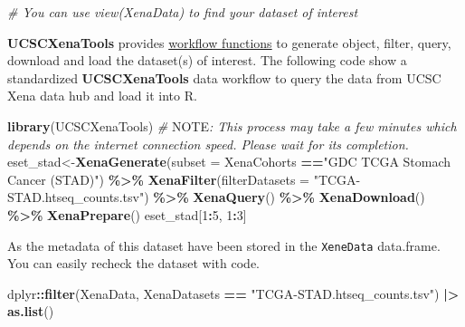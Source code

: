 \documentclass[
  12pt,
]{book}
\newenvironment{Shaded}{\begin{snugshade}}{\end{snugshade}}
\newcommand{\AlertTok}[1]{\textcolor[rgb]{0.94,0.16,0.16}{#1}}
\newcommand{\AttributeTok}[1]{\textcolor[rgb]{0.13,0.29,0.53}{#1}}
\newcommand{\CommentTok}[1]{\textcolor[rgb]{0.56,0.35,0.01}{\textit{#1}}}
\newcommand{\DecValTok}[1]{\textcolor[rgb]{0.00,0.00,0.81}{#1}}
\newcommand{\FunctionTok}[1]{\textcolor[rgb]{0.13,0.29,0.53}{\textbf{#1}}}
\newcommand{\NormalTok}[1]{#1}
\newcommand{\OtherTok}[1]{\textcolor[rgb]{0.56,0.35,0.01}{#1}}
\newcommand{\SpecialCharTok}[1]{\textcolor[rgb]{0.81,0.36,0.00}{\textbf{#1}}}
\newcommand{\StringTok}[1]{\textcolor[rgb]{0.31,0.60,0.02}{#1}}
\begin{document}
\begin{Shaded}
\begin{Highlighting}[]
\CommentTok{\# You can use view(XenaData) to find your dataset of interest}
\end{Highlighting}
\end{Shaded}

\textbf{UCSCXenaTools} provides \href{https://cran.r-project.org/web/packages/UCSCXenaTools/vignettes/USCSXenaTools.html\#workflow}{workflow functions} to generate object, filter, query, download and load the dataset(s) of interest. The following code show a standardized \textbf{UCSCXenaTools} data workflow to query the data from UCSC Xena data hub and load it into R.

\begin{Shaded}
\begin{Highlighting}[]
\FunctionTok{library}\NormalTok{(UCSCXenaTools)}
\CommentTok{\# }\AlertTok{NOTE}\CommentTok{: This process may take a few minutes which depends on the internet connection speed. Please wait for its completion.}
\NormalTok{eset\_stad}\OtherTok{\textless{}{-}}\FunctionTok{XenaGenerate}\NormalTok{(}\AttributeTok{subset =}\NormalTok{ XenaCohorts }\SpecialCharTok{==}\StringTok{"GDC TCGA Stomach Cancer (STAD)"}\NormalTok{) }\SpecialCharTok{\%\textgreater{}\%} 
  \FunctionTok{XenaFilter}\NormalTok{(}\AttributeTok{filterDatasets    =} \StringTok{"TCGA{-}STAD.htseq\_counts.tsv"}\NormalTok{) }\SpecialCharTok{\%\textgreater{}\%} 
  \FunctionTok{XenaQuery}\NormalTok{() }\SpecialCharTok{\%\textgreater{}\%}
  \FunctionTok{XenaDownload}\NormalTok{() }\SpecialCharTok{\%\textgreater{}\%} 
  \FunctionTok{XenaPrepare}\NormalTok{()}
\NormalTok{eset\_stad[}\DecValTok{1}\SpecialCharTok{:}\DecValTok{5}\NormalTok{, }\DecValTok{1}\SpecialCharTok{:}\DecValTok{3}\NormalTok{]}
\end{Highlighting}
\end{Shaded}

As the metadata of this dataset have been stored in the \texttt{XeneData} data.frame. You can easily recheck the dataset with code.

\begin{Shaded}
\begin{Highlighting}[]
\NormalTok{dplyr}\SpecialCharTok{::}\FunctionTok{filter}\NormalTok{(XenaData, XenaDatasets }\SpecialCharTok{==} \StringTok{"TCGA{-}STAD.htseq\_counts.tsv"}\NormalTok{) }\SpecialCharTok{|\textgreater{}} 
  \FunctionTok{as.list}\NormalTok{()}
\end{Highlighting}
\end{Shaded}
\end{document}
